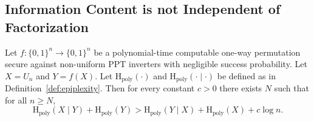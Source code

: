 \documentclass[twoside]{article}
\newcommand{\rH}{\mathrm{H}}
\begin{document}
\subsection{Information Content is not Independent of Factorization}
\label{sec:inf_fac}

%
%
%
%
%
%
%
%
%
%
%
%
%
%
%
    
%
%
    
%
    
%
%
%
%
%
%
%
%
%
%
%
%
%
%
%
%
%
%

%

\begin{theorem}
%
\label{thm:soi_entropy}
Let $f:\{0,1\}^n\to\{0,1\}^n$ be a polynomial-time computable one-way permutation secure
against non-uniform PPT inverters with negligible success probability. Let
$X= U_n$ and $Y=f(X)$. 
%
%
%
%
%
%
Let $\rH_{\mathrm{poly}}(\cdot)$ and $\rH_{\mathrm{poly}}(\cdot\mid\cdot)$ be defined as in
Definition~\ref{def:epiplexity}. Then for every constant $c>0$ there exists $N$ such that
for all $n\ge N$,
\[
\rH_{\mathrm{poly}}(X \mid Y) + \rH_{\mathrm{poly}}(Y)
>
\rH_{\mathrm{poly}}(Y\mid X) + \rH_{\mathrm{poly}}(X) + c\log n.
\]
\end{theorem}
\end{document}
